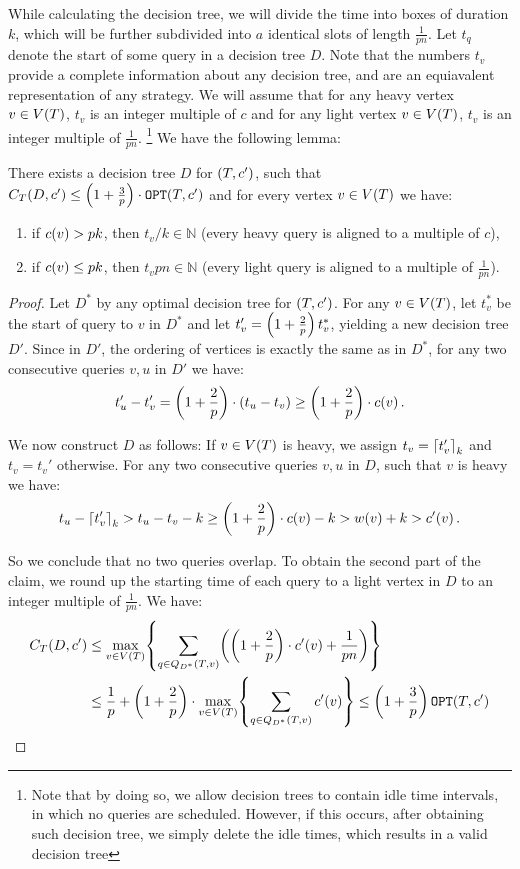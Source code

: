 While calculating the decision tree, we will divide the time into boxes of duration $k$, which will be further subdivided into $a$ identical slots of length $\frac{1}{pn}$. Let $t_q$ denote the start of some query in a decision tree $D$. Note that the numbers $t_v$ provide a complete information about any decision tree, and are an equiavalent representation of any strategy. We will assume that for any heavy vertex $v\in V\mathopen{}\left( T \right)$, $t_v$ is an integer multiple of $c$ and for any light vertex $v\in V\mathopen{}\left( T \right)$, $t_v$ is an integer multiple of $\frac{1}{pn}$. \footnote{Note that by doing so, we allow decision trees to contain idle time intervals, in which no queries are scheduled. However, if this occurs, after obtaining such decision tree, we simply delete the idle times, which results in a valid decision tree} We have the following lemma:
\begin{lemma}\label{aligned_dts_lemma}
    There exists a decision tree $D$ for $\mathopen{}\left( T,c' \right)$, such that $C_{T}\mathopen{}\left( D, c' \right)\leq \mathopen{}\left( 1+\frac{3}{p} \right)\cdot\texttt{OPT}\mathopen{}\left( T, c' \right)$ and for every vertex $v\in V\mathopen{}\left( T \right)$ we have:
    \begin{enumerate}
        \item if $c\mathopen{}\left( v \right)> pk$, then $t_v/k\in\mathbb{N}$ (every heavy query is aligned to a multiple of $c$),
        \item if $c\mathopen{}\left( v \right)\leq pk$, then $t_vpn\in\mathbb{N}$ (every light query is aligned to a multiple of $\frac{1}{pn}$).
    \end{enumerate}
    \begin{proof}
        Let $D^*$ by any optimal decision tree for $\mathopen{}\left( T,c' \right)$. For any $v\in V\mathopen{}\left( T \right)$, let $t_v^*$ be the start of query to $v$ in $D^*$ and let $t_v'=\mathopen{}\left( 1+\frac{2}{p} \right)t_v^*$, yielding a new decision tree $D'$. Since in $D'$, the ordering of vertices is exactly the same as in $D^*$, for any two consecutive queries $v,u$ in $D'$ we have:
        $$
            t_u'-t_v'=\mathopen{}\left( 1+\frac{2}{p} \right)\cdot\mathopen{}\left( t_u-t_v \right)\geq \mathopen{}\left( 1+\frac{2}{p} \right)\cdot c\mathopen{}\left( v \right).
        $$

        We now construct $D$ as follows: If $v\in V\mathopen{}\left( T \right)$ is heavy, we assign $t_v=\mathopen{}\left\lceil t_v' \right\rceil_k$ and $t_v=t_v'$ otherwise. For any two consecutive queries $v,u$ in $D$, such that $v$ is heavy we have:
        $$
        t_u-\mathopen{}\left\lceil t_v' \right\rceil_k>t_u-t_v-k\geq \mathopen{}\left( 1+\frac{2}{p} \right)\cdot c\mathopen{}\left( v \right)-k>w\mathopen{}\left( v \right)+k>c'\mathopen{}\left( v \right).
        $$

        So we conclude that no two queries overlap. To obtain the second part of the claim, we round up the starting time of each query to a light vertex in $D$ to an integer multiple of $\frac{1}{pn}$. We have:
        \begin{align*}
            C_{T}\mathopen{}\left( D,c' \right)&
            \leq \max_{v\in V\mathopen{}\left( T \right)}\mathopen{}\left\{ \sum_{q\in Q_{D^*}\mathopen{}\left( T,v \right)}\mathopen{}\left( \mathopen{}\left( 1+\frac{2}{p} \right)\cdot c'\mathopen{}\left( v \right)+\frac{1}{pn} \right) \right\}
            \\&
            \leq \frac{1}{p}+\mathopen{}\left( 1+\frac{2}{p} \right)\cdot \max_{v\in V\mathopen{}\left( T \right)}\mathopen{}\left\{ \sum_{q\in Q_{D^*}\mathopen{}\left( T,v \right)}c'\mathopen{}\left( v \right)  \right\}\leq \mathopen{}\left( 1+\frac{3}{p} \right)\texttt{OPT}\mathopen{}\left( T,c' \right)
        \end{align*}


\end{proof}
\end{lemma}
